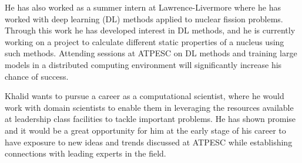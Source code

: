 \documentclass{article}
\begin{document}
He has also worked as a summer intern at Lawrence-Livermore where he
has worked with deep learning (DL) methods applied to nuclear fission problems. 
Through this work he has developed interest in DL methods, and he is currently
working on a project to calculate different static properties of a nucleus 
using such methods. Attending sessions at ATPESC on DL methods and training 
large models in a distributed computing environment will significantly increase 
his chance of success.

Khalid wants to pursue a career as a computational scientist, where he would
work with domain scientists to enable them in leveraging the resources 
available at leadership class facilities to tackle important problems. He has 
shown promise and it would be a great opportunity for him at the early stage
of his career to have exposure to new ideas and trends discussed at ATPESC 
while establishing connections with leading experts in the field.
\end{document}
